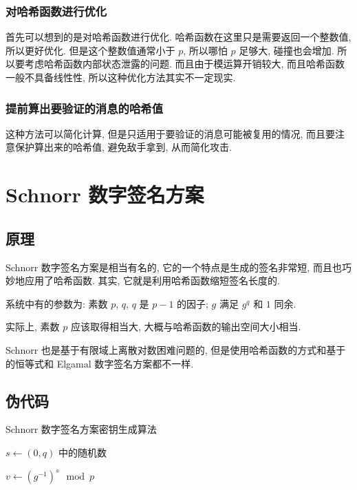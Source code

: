 \documentclass[12pt,a4paper]{article}
\begin{document}
\subsubsection*{对哈希函数进行优化}

首先可以想到的是对哈希函数进行优化. 哈希函数在这里只是需要返回一个整数值, 所以更好优化. 但是这个整数值通常小于 $ p $, 所以哪怕 $ p $ 足够大, 碰撞也会增加. 所以要考虑哈希函数内部状态泄露的问题. 而且由于模运算开销较大, 而且哈希函数一般不具备线性性, 所以这种优化方法其实不一定现实. 

\subsubsection*{提前算出要验证的消息的哈希值}

这种方法可以简化计算, 但是只适用于要验证的消息可能被复用的情况, 而且要注意保护算出来的哈希值, 避免敌手拿到, 从而简化攻击. 

\section*{Schnorr 数字签名方案}

\subsection*{原理}

Schnorr 数字签名方案是相当有名的, 它的一个特点是生成的签名非常短, 而且也巧妙地应用了哈希函数. 其实, 它就是利用哈希函数缩短签名长度的. 

系统中有的参数为: 素数 $ p $, $ q $, $ q $ 是 $ p - 1 $ 的因子; $ g $ 满足 $ g^q $ 和 $ 1 $ 同余. 

实际上, 素数 $ p $ 应该取得相当大, 大概与哈希函数的输出空间大小相当. 

Schnorr 也是基于有限域上离散对数困难问题的, 但是使用哈希函数的方式和基于的恒等式和 Elgamal 数字签名方案都不一样. 

\subsection*{伪代码}

\begin{algorithm}[H]
\caption{Schnorr 数字签名方案密钥生成算法}

$ s \leftarrow (0, q) $ 中的随机数

$ v \leftarrow (g^{-1})^s \mod p $

\end{algorithm}
\end{document}
